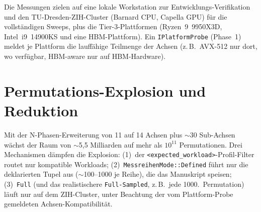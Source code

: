 Die Messungen zielen auf eine lokale Workstation zur Entwicklungs-Verifikation und den
TU-Dresden-ZIH-Cluster (Barnard CPU, Capella GPU) für die vollständigen Sweeps, plus die
Tier-3-Plattformen (Ryzen~9~9950X3D, Intel~i9~14900KS und eine HBM-Plattform). Ein
\texttt{IPlatformProbe} (Phase~1) meldet je Plattform die lauffähige Teilmenge der Achsen
(z.\,B.\ AVX-512 nur dort, wo verfügbar, HBM-aware nur auf HBM-Hardware).

\section{Permutations-Explosion und Reduktion}\label{sec:explosion}

Mit der N-Phasen-Erweiterung von 11 auf 14 Achsen plus $\sim$30 Sub-Achsen wächst der Raum von
$\sim$5,5 Milliarden auf mehr als $10^{11}$ Permutationen. Drei Mechanismen dämpfen die
Explosion: (1)~der \texttt{<expected\_workload>}-Profil-Filter routet nur kompatible
Workloads; (2)~\texttt{MessreihenMode::Defined} führt nur die deklarierten Tupel aus
($\sim$100--1000 je Reihe), die das Manuskript speisen; (3)~\texttt{Full} (und das
realistischere \texttt{Full-Sampled}, z.\,B.\ jede 1000.\ Permutation) läuft nur auf dem
ZIH-Cluster, unter Beachtung der vom Plattform-Probe gemeldeten Achsen-Kompatibilität.
